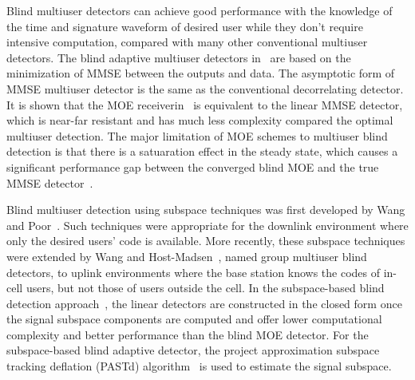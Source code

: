 \documentclass[a4paper,11pt,fleqn]{article}
\begin{document}
Blind multiuser detectors can achieve good performance with the
knowledge of the time and signature waveform of desired user while
they don't require intensive computation, compared with many other
conventional multiuser detectors. The blind adaptive multiuser
detectors in~\cite{Madh94,Honi95} are based on the minimization of
MMSE between the outputs and data. The asymptotic form of MMSE
multiuser detector is the same as the conventional decorrelating
detector. It is shown that the MOE receiverin~\cite{Honi95} is
equivalent to the linear MMSE detector, which is near-far
resistant and has much less complexity compared the optimal
multiuser detection. The major limitation of MOE schemes to
multiuser blind detection is that there is a satuaration effect in
the steady state, which causes a significant performance gap
between the converged blind MOE and the true MMSE
detector~\cite{Honi95}.

Blind multiuser detection using subspace techniques was first
developed by Wang and Poor~\cite{Wang98, Poor98}. Such techniques
were appropriate for the downlink environment where only the
desired users' code is available. More recently, these subspace
techniques were extended by Wang and Host-Madsen~\cite{Wang99},
named group multiuser blind detectors, to uplink environments
where the base station knows the codes of in-cell users, but not
those of users outside the cell. In the subspace-based blind
detection approach~\cite{Wang98}, the linear detectors are
constructed in the closed form once the signal subspace components
are computed and offer lower computational complexity and better
performance than the blind MOE detector. For the subspace-based
blind adaptive detector, the project approximation subspace
tracking deflation (PASTd) algorithm~\cite{Yang95} is used to
estimate the signal subspace.
\end{document}
